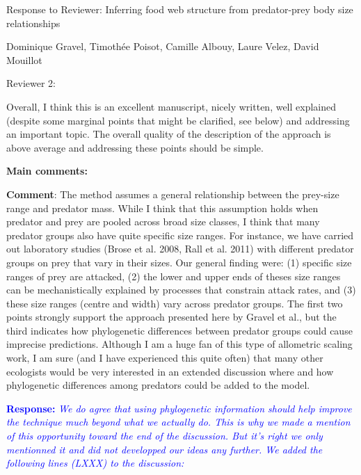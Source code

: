 \documentclass [12pt,onecolumn,twoside,openright]{report}
\begin{document}
 \begin{onehalfspacing} \begin{center} \large{Response to
Reviewer: Inferring food web structure from predator-prey body size
relationships} \end{center}

Dominique Gravel, Timoth\'ee Poisot, Camille Albouy, Laure Velez, David Mouillot
\begin{center} Reviewer 2: \end{center}

Overall, I think this is an excellent manuscript, nicely written, well explained
(despite some marginal points that might be clarified, see below) and addressing
an important topic. The overall quality of the description of the approach is
above average and addressing these points should be simple.

\medskip \textbf{\large{Main comments:}}

\medskip \textbf{Comment}: The method assumes a general
relationship between the prey-size range and predator mass. While I think that
this assumption holds when predator and prey are pooled across broad size
classes, I think that many predator groups also have quite specific size ranges.
For instance, we have carried out laboratory studies (Brose et al. 2008, Rall et
al. 2011) with different predator groups on prey that vary in their sizes. Our
general finding were: (1) specific size ranges of prey are attacked, (2) the
lower and upper ends of theses size ranges can be mechanistically explained by
processes that constrain attack rates, and (3) these size ranges (centre and
width) vary across predator groups. The first two points strongly support the
approach presented here by Gravel et al., but the third indicates how
phylogenetic differences between predator groups could cause imprecise
predictions. Although I am a huge fan of this type of allometric scaling work, I
am sure (and I have experienced this quite often) that many other ecologists
would be very interested in an extended discussion where and how phylogenetic
differences among predators could be added to the model.

\medskip \textcolor{blue}{\textbf{Response:}} \textit{\textcolor{blue}{We do agree that using phylogenetic information should help improve the technique much beyond what we actually do. This is why we made a mention of this opportunity toward the end of the discussion. But it's right we only mentionned it and did not developped our ideas any further. We added the following lines (LXXX) to the discussion:}}  


\end{onehalfspacing}
\end{document}
